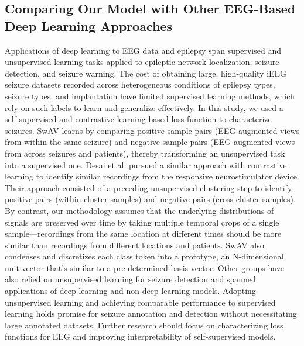 \documentclass[11pt]{article}
\begin{document}
\subsection*{Comparing Our Model with Other EEG-Based Deep Learning Approaches}
Applications of deep learning to EEG data and epilepsy span supervised and unsupervised learning tasks applied to epileptic network localization, seizure detection, and seizure warning. The cost of obtaining large, high-quality iEEG seizure datasets recorded across heterogeneous conditions of epilepsy types, seizure types, and implantation have limited supervised learning methods, which rely on such labels to learn and generalize effectively. In this study, we used a self-supervised and contrastive learning-based loss function to characterize seizures. SwAV learns by comparing positive sample pairs (EEG augmented views from within the same seizure) and negative sample pairs (EEG augmented views from across seizures and patients), thereby transforming an unsupervised task into a supervised one. Desai et al. pursued a similar approach with contrastive learning to identify similar recordings from the responsive neurostimulator device\cite{Arcot2022Non}. Their approach consisted of a preceding unsupervised clustering step to identify positive pairs (within cluster samples) and negative pairs (cross-cluster samples). By contrast, our methodology assumes that the underlying distributions of signals are preserved over time by taking multiple temporal crops of a single sample—recordings from the same location at different times should be more similar than recordings from different locations and patients. SwAV also condenses and discretizes each class token into a prototype, an N-dimensional unit vector that’s similar to a pre-determined basis vector. Other groups have also relied on unsupervised learning for seizure detection and spanned applications of deep learning and non-deep learning models\cite{Bhattacharya2023Unsupervised,Gardner2006One,Potter2022Unsupervised,Yamada2022Seizure, Xu_2025}. Adopting unsupervised learning and achieving comparable performance to supervised learning holds promise for seizure annotation and detection without necessitating large annotated datasets\cite{Brinkmann2016Crowdsourcing,Kuhlmann2018Epilepsyecosystem}. Further research should focus on characterizing loss functions for EEG and improving interpretability of self-supervised models.
\end{document}

